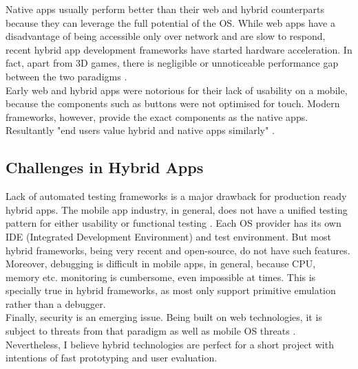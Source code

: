 Native apps usually perform better than their web and hybrid counterparts because they can leverage the full potential of the OS. While web apps have a disadvantage of being accessible only over network and are slow to respond, recent hybrid app development frameworks have started hardware acceleration. In fact, apart from 3D games, there is negligible or unnoticeable performance gap between the two paradigms \cite{Charland:2011}.\\

Early web and hybrid apps were notorious for their lack of usability on a mobile, because the components such as buttons were not optimised for touch. Modern frameworks, however, provide the exact components as the native apps. Resultantly "end users value hybrid and native apps similarly" \cite{Malavolta:2015}.

\subsection{Challenges in Hybrid Apps}

Lack of automated testing frameworks is a major drawback for production ready hybrid apps. The mobile app industry, in general, does not have a unified testing pattern for either usability or functional testing \cite{Joorabchi:2013}. Each OS provider has its own IDE (Integrated Development Environment) and test environment. But most hybrid frameworks, being very recent and open-source, do not have such features.\\

Moreover, debugging is difficult in mobile apps, in general, because CPU, memory etc. monitoring is cumbersome, even impossible at times. This is specially true in hybrid frameworks, as most only support primitive emulation rather than a debugger.\\

Finally, security is an emerging issue. Being built on web technologies, it is subject to threats from that paradigm as well as mobile OS threats \cite{Brucker:2016, Hale:2015}.\\

Nevertheless, I believe hybrid technologies are perfect for a short project with intentions of fast prototyping and user evaluation.





